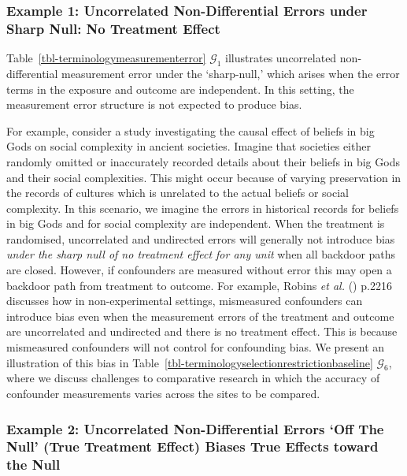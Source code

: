 \documentclass[
  single column]{article}
\begin{document}
\subsubsection{Example 1: Uncorrelated Non-Differential Errors under
Sharp Null: No Treatment
Effect}\label{example-1-uncorrelated-non-differential-errors-under-sharp-null-no-treatment-effect}

Table~\ref{tbl-terminologymeasurementerror} \(\mathcal{G}_1\)
illustrates uncorrelated non-differential measurement error under the
`sharp-null,' which arises when the error terms in the exposure and
outcome are independent. In this setting, the measurement error
structure is not expected to produce bias.

For example, consider a study investigating the causal effect of beliefs
in big Gods on social complexity in ancient societies. Imagine that
societies either randomly omitted or inaccurately recorded details about
their beliefs in big Gods and their social complexities. This might
occur because of varying preservation in the records of cultures which
is unrelated to the actual beliefs or social complexity. In this
scenario, we imagine the errors in historical records for beliefs in big
Gods and for social complexity are independent. When the treatment is
randomised, uncorrelated and undirected errors will generally not
introduce bias \emph{under the sharp null of no treatment effect for any
unit} when all backdoor paths are closed. However, if confounders are
measured without error this may open a backdoor path from treatment to
outcome. For example, Robins \emph{et al.}
() p.2216 discusses how in
non-experimental settings, mismeasured confounders can introduce bias
even when the measurement errors of the treatment and outcome are
uncorrelated and undirected and there is no treatment effect. This is
because mismeasured confounders will not control for confounding bias.
We present an illustration of this bias in
Table~\ref{tbl-terminologyselectionrestrictionbaseline}
\(\mathcal{G}_6\), where we discuss challenges to comparative research
in which the accuracy of confounder measurements varies across the sites
to be compared.

\subsubsection{Example 2: Uncorrelated Non-Differential Errors `Off The
Null' (True Treatment Effect) Biases True Effects toward the
Null}\label{example-2-uncorrelated-non-differential-errors-off-the-null-true-treatment-effect-biases-true-effects-toward-the-null}
\end{document}
